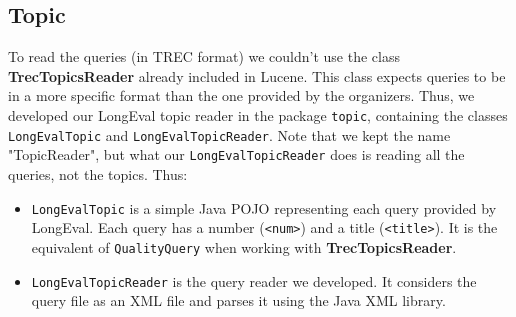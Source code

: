 \subsection{Topic}\label{subsec:topic}

To read the queries (in TREC format) we couldn't use the class \textbf{TrecTopicsReader} already included in Lucene.
This class expects queries to be in a more specific format than the one provided by the organizers.
Thus, we developed our LongEval topic reader in the package \texttt{topic}, containing the classes
\texttt{LongEvalTopic} and \texttt{LongEvalTopicReader}.
Note that we kept the name "TopicReader", but what our \texttt{LongEvalTopicReader} does is reading all the queries,
not the topics.
Thus:
\begin{itemize}
    \item \texttt{LongEvalTopic} is a simple Java POJO representing each query provided by LongEval.
    Each query has a number (\texttt{<num>}) and a title (\texttt{<title>}).
    It is the equivalent of \texttt{QualityQuery} when working with \textbf{TrecTopicsReader}.
    \item \texttt{LongEvalTopicReader} is the query reader we developed.
    It considers the query file as an XML file and parses it using the Java XML library.
\end{itemize}